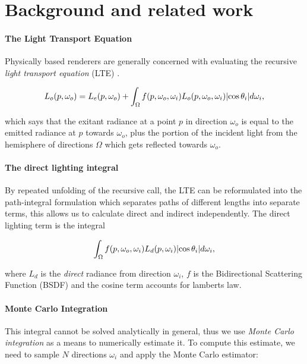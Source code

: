 \section{Background and related work}
\label{sec:background}

\paragraph*{The Light Transport Equation} Physically based renderers are generally concerned with evaluating the recursive \emph{light transport equation} (LTE) \cite*[]{kajiyaRENDERINGEQUATION1986}.

\begin{equation}
  \tiny
  L_o(p, \omega_o) = L_e(p, \omega_o) + \int_{\Omega} f(p, \omega_o, \omega_i) L_o(p, \omega_o, \omega_i) \lvert\cos\theta_i\rvert d\omega_i,
\end{equation}

which says that the exitant radiance at a point $p$ in direction $\omega_o$ is equal to the emitted radiance at $p$ towards $\omega_o$, plus the portion of the incident light from the hemisphere of directions $\Omega$ which gets reflected towards $\omega_o$. 

\paragraph{The direct lighting integral} 


By repeated unfolding of the recursive call, the LTE can be reformulated into the path-integral formulation \cite*{veachROBUSTMONTECARLO} which separates paths of different lengths into separate terms, this allows us to calculate direct and indirect independently. The direct lighting term is the integral

\begin{equation}
  \int_{\Omega} f(p, \omega_o, \omega_i) L_d(p, \omega_i) \lvert\cos\theta_i\rvert d\omega_i,
\end{equation}

where $L_d$ is the \emph{direct} radiance from direction $\omega_i$, $f$ is the Bidirectional Scattering Function (BSDF) and the cosine term accounts for lamberts law.

\paragraph*{Monte Carlo Integration}
This integral cannot be solved analytically in general, thus we use \emph{Monte Carlo integration} as a means to numerically estimate it. To compute this estimate, we need to sample $N$ directions $\omega_i$ and apply the Monte Carlo estimator:

